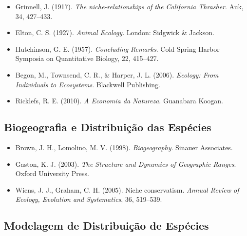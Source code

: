 \begin{itemize}
	
	\item Grinnell, J. (1917). \textit{The niche-relationships of the California Thrasher}. Auk, 34, 427--433.
	
	\item Elton, C. S. (1927). \textit{Animal Ecology}. London: Sidgwick & Jackson.
	
	\item Hutchinson, G. E. (1957). \textit{Concluding Remarks}. Cold Spring Harbor Symposia on Quantitative Biology, 22, 415--427.
	
	\item Begon, M., Townsend, C. R., & Harper, J. L. (2006). \textit{Ecology: From Individuals to Ecosystems}. Blackwell Publishing.
	
	\item Ricklefs, R. E. (2010). \textit{A Economia da Natureza}. Guanabara Koogan.
	
\end{itemize}

\subsection*{Biogeografia e Distribuição das Espécies}

\begin{itemize}
	
	\item Brown, J. H., Lomolino, M. V. (1998). \textit{Biogeography}. Sinauer Associates.
	
	\item Gaston, K. J. (2003). \textit{The Structure and Dynamics of Geographic Ranges}. Oxford University Press.
	
	\item Wiens, J. J., Graham, C. H. (2005). Niche conservatism. \textit{Annual Review of Ecology, Evolution and Systematics}, 36, 519--539.
	
\end{itemize}

\subsection*{Modelagem de Distribuição de Espécies}

